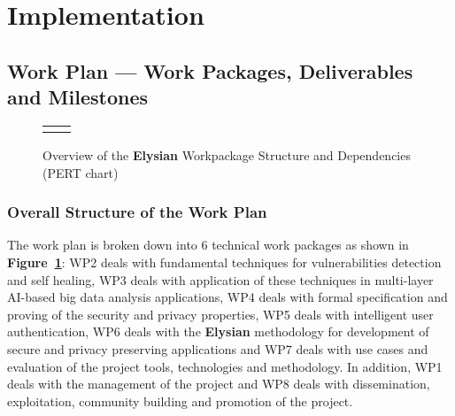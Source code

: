 \documentclass[a4paper,11pt]{article}
\newcommand{\project}[1]{\textbf{#1}\xspace}
\newcommand{\SECURITY}{\project{Elysian}}
\newcommand{\TheProject}{\SECURITY}
\begin{document}
\clearpage



\clearpage
\section{Implementation}

\subsection{Work Plan --- Work Packages, Deliverables and Milestones}
\label{sect:workplan}


\begin{figure}[tp]
\begin{center}
\vspace{-5mm}
\begin{tabular}{ll}
\hspace{-0.75in}
[scale=0.5]{PertChart.pdf}
\vspace{-10mm}
\end{tabular}
\caption{Overview of the \TheProject{} Workpackage Structure and Dependencies (PERT chart)}
\label{fig:wps}
\end{center}
\end{figure}

\subsubsection*{Overall Structure of the Work Plan}

The work plan is broken down into 6 technical work packages as shown
in \textbf{Figure~\ref{fig:wps}}: WP2 deals with fundamental techniques for vulnerabilities detection and self healing, WP3 deals with application of these techniques in multi-layer AI-based big data analysis applications, WP4 deals with formal specification and proving of the security and privacy properties, WP5 deals with intelligent user authentication, WP6 deals with the \TheProject{} methodology for development of secure and privacy preserving applications and WP7 deals with use cases and evaluation of the project tools, technologies and methodology. In addition, WP1 deals with the management of the project and WP8 deals with dissemination, exploitation, community building and promotion of the project.


\end{document}

